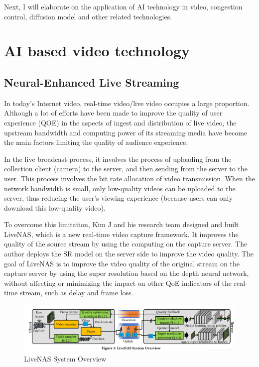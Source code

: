 \documentclass[conference]{IEEEtran}
\begin{document}
Next, I will elaborate on the application of AI technology in video, congestion control, diffusion model and other related technologies.

\section{AI based video technology}
\subsection{Neural-Enhanced Live Streaming}

In today's Internet video, real-time video/live video occupies a large proportion. Although a lot of efforts have been made to improve the quality of user experience (QOE) in the aspects of ingest and distribution of live video, the upstream bandwidth and computing power of its streaming media have become the main factors limiting the quality of audience experience.

In the live broadcast process, it involves the process of uploading from the collection client (camera) to the server, and then sending from the server to the user. This process involves the bit rate allocation of video transmission. When the network bandwidth is small, only low-quality videos can be uploaded to the server, thus reducing the user's viewing experience (because users can only download this low-quality video).

To overcome this limitation, Kim J and his research team designed and built LiveNAS\cite{a1}, which is a new real-time video capture framework. It improves the quality of the source stream by using the computing on the capture server. The author deploys the SR model on the server side to improve the video quality. The goal of LiveNAS is to improve the video quality of the original stream on the capture server by using the super resolution based on the depth neural network, without affecting or minimizing the impact on other QoE indicators of the real-time stream, such as delay and frame loss.

\begin{figure}[!h]
\centerline{\includegraphics[scale=0.123]{picture/figure2-1.png}}
\caption{LiveNAS System Overview\cite{a1}}
\label{fig2-1}
\end{figure}
\end{document}
